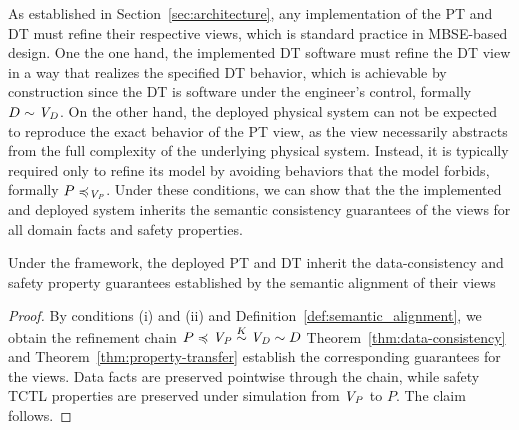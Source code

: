  As established in Section~\ref{sec:architecture}, any implementation of the PT and DT must refine their respective views, which is standard practice in MBSE-based design. One the one hand, the implemented DT software must refine the DT view in a way that realizes the specified DT behavior, which is achievable by construction since the DT is software under the engineer's control, formally $D \sim \mathit{V_D}$. On the other hand, the deployed physical system can not be expected to reproduce the exact behavior of the PT view, as the view necessarily abstracts from the full complexity of the underlying physical system. Instead, it is typically required only to refine its model by avoiding behaviors that the model forbids, formally $P \preccurlyeq_{\mathit{V_P}}$. Under these conditions, we can show that the the implemented and deployed system inherits the semantic consistency guarantees of the views for all domain facts and safety properties. 
 



\begin{theorem}
\label{cor:deployed-subsumption}
Under the framework, the deployed PT and DT inherit the data-consistency and safety property guarantees established by the semantic alignment of their views
\end{theorem}
 
\begin{proof}
By conditions (i) and (ii) and
Definition~\ref{def:semantic_alignment}, we obtain the refinement chain $P \preccurlyeq_{} \mathit{V_P} \stackrel{K}{\sim} \mathit{V_D} \sim D$
Theorem~\ref{thm:data-consistency} and
Theorem~\ref{thm:property-transfer} establish the corresponding
guarantees for the views. Data facts are preserved pointwise through
the chain, while safety TCTL properties are preserved under
simulation from $\mathit{V_P}$ to $P$. The claim follows.
\end{proof}

